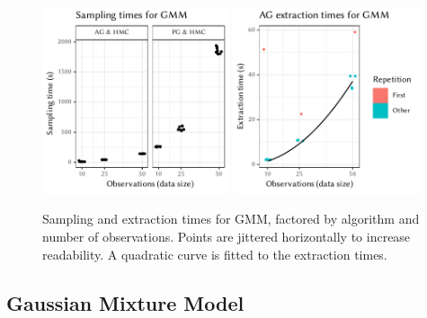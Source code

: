 \cleartoverso
\FloatBlock

\newcommand{\leftplotcaption}[1]{%
  Sampling and extraction times for #1, factored by algorithm and number of observations.  Points
  are jittered horizontally to increase readability.  A quadratic curve is fitted to the extraction
  times.
}

\newcommand{\rightplotcaption}[1]{%
  Diagnostics, factored by algorithm, number of observations, and a selection of model parameters.
  \(\widehat{\mathrm{R}}\) and ESS point estimates are jittered horizontally for better readability.
  A horizontal line marks the reference value of \(1.1\) in the \(\widehat{\mathrm{R}}\) plot.  For
  chain plots and autocorrelation, the third chain of the respective combination has been used.
}

\begin{figure}[t!]
  \centering
  \includegraphics[width=0.49\textwidth]{figures/GMM-sampling_times}
  \includegraphics[width=0.49\textwidth]{figures/GMM-compile_times}
  \caption{\leftplotcaption{GMM}}
  \label{fig:plots-gmm-left}
\end{figure}

\subsection*{Gaussian Mixture Model}

